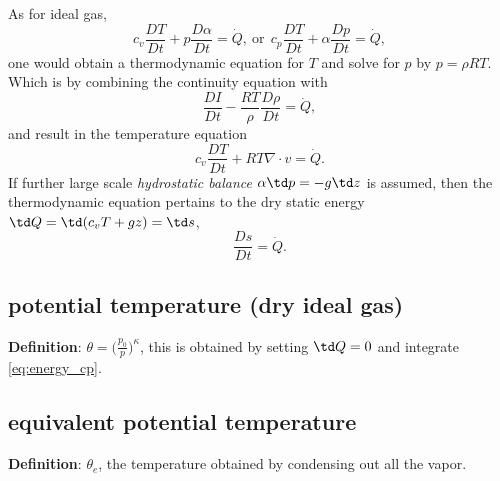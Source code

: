 As for {\clr ideal gas}, 
\begin{equation}
    c_v\frac{DT}{Dt} + p \frac{D\alpha}{Dt} = \dot{Q}, \ \text{or} \ \ 
    c_p\frac{DT}{Dt} + \alpha \frac{Dp}{Dt} = \dot{Q},
\end{equation}
one would obtain a thermodynamic equation for $T$ and solve for $p$ by $p = \rho R T$. Which is
by combining the continuity equation with
\begin{equation}
    \frac{DI}{Dt} - \frac{RT}{\rho} \frac{D\rho}{Dt} = \dot{Q},
\end{equation}
and result in the temperature equation
\begin{equation}
    \boxed{c_v\frac{DT}{Dt} + RT \nabla \cdot v = \dot{Q}}.
\end{equation}
If further large scale \emph{\clr hydrostatic balance} $\alpha \td p = -g \td z$ is assumed, then the
thermodynamic equation pertains to the dry static energy $\td Q = \td (c_v T + gz) = \td s$, 
\begin{equation}
   \boxed{\frac{Ds}{Dt} = \dot{Q}}.
\end{equation}

\subsection{potential temperature (dry ideal gas)}
{\bf{Definition}}: $\theta = \big(\frac{p_0}{p}\big)^\kappa$, this is obtained by setting $\td Q=0$ and
integrate \eqref{eq:energy_cp}. 

\subsection{equivalent potential temperature}
{\bf{Definition}}: $\theta_e$, the temperature obtained by condensing out all the vapor. \\

